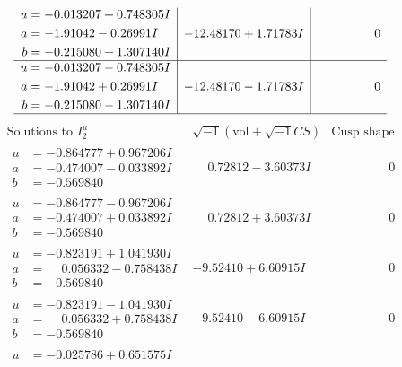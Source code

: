 \documentclass[1p]{elsarticle_modified}
\theoremstyle{definition}
\newcommand{\I}{\sqrt{-1}}
\begin{document}
$$\begin{array}{c|c|c}
\begin{aligned}
u &= -0.013207 + 0.748305 I \\
a &= -1.91042 - 0.26991 I \\
b &= -0.215080 + 1.307140 I\end{aligned}
 & -12.48170 + 1.71783 I & \phantom{-0.000000 } 0 \\ \hline\begin{aligned}
u &= -0.013207 - 0.748305 I \\
a &= -1.91042 + 0.26991 I \\
b &= -0.215080 - 1.307140 I\end{aligned}
 & -12.48170 - 1.71783 I & \phantom{-0.000000 } 0\\
 \hline 
 \end{array}$$\newpage$$\begin{array}{c|c|c}  
\text{Solutions to }I^u_{2}& \I (\text{vol} + \sqrt{-1}CS) & \text{Cusp shape}\\
 \hline 
\begin{aligned}
u &= -0.864777 + 0.967206 I \\
a &= -0.474007 - 0.033892 I \\
b &= -0.569840\phantom{ +0.000000I}\end{aligned}
 & \phantom{-}0.72812 - 3.60373 I & \phantom{-0.000000 } 0 \\ \hline\begin{aligned}
u &= -0.864777 - 0.967206 I \\
a &= -0.474007 + 0.033892 I \\
b &= -0.569840\phantom{ +0.000000I}\end{aligned}
 & \phantom{-}0.72812 + 3.60373 I & \phantom{-0.000000 } 0 \\ \hline\begin{aligned}
u &= -0.823191 + 1.041930 I \\
a &= \phantom{-}0.056332 - 0.758438 I \\
b &= -0.569840\phantom{ +0.000000I}\end{aligned}
 & -9.52410 + 6.60915 I & \phantom{-0.000000 } 0 \\ \hline\begin{aligned}
u &= -0.823191 - 1.041930 I \\
a &= \phantom{-}0.056332 + 0.758438 I \\
b &= -0.569840\phantom{ +0.000000I}\end{aligned}
 & -9.52410 - 6.60915 I & \phantom{-0.000000 } 0 \\ \hline\begin{aligned}
u &= -0.025786 + 0.651575 I \\

\end{aligned}
\end{array}$$
\end{document}
